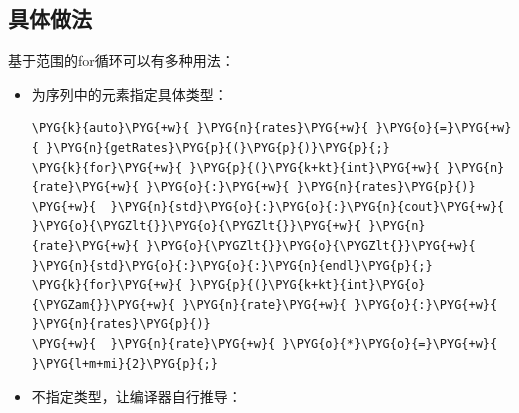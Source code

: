 
\subsection{具体做法}



基于范围的for循环可以有多种用法：



\begin{itemize}
\item 为序列中的元素指定具体类型：



\begin{codeblockbg}
\begin{Verbatim}[commandchars=\\\{\},breaklines=true,breakanywhere=true,fontsize=\codefont,xleftmargin=17bp]
\PYG{k}{auto}\PYG{+w}{ }\PYG{n}{rates}\PYG{+w}{ }\PYG{o}{=}\PYG{+w}{ }\PYG{n}{getRates}\PYG{p}{(}\PYG{p}{)}\PYG{p}{;}
\PYG{k}{for}\PYG{+w}{ }\PYG{p}{(}\PYG{k+kt}{int}\PYG{+w}{ }\PYG{n}{rate}\PYG{+w}{ }\PYG{o}{:}\PYG{+w}{ }\PYG{n}{rates}\PYG{p}{)}
\PYG{+w}{  }\PYG{n}{std}\PYG{o}{:}\PYG{o}{:}\PYG{n}{cout}\PYG{+w}{ }\PYG{o}{\PYGZlt{}}\PYG{o}{\PYGZlt{}}\PYG{+w}{ }\PYG{n}{rate}\PYG{+w}{ }\PYG{o}{\PYGZlt{}}\PYG{o}{\PYGZlt{}}\PYG{+w}{ }\PYG{n}{std}\PYG{o}{:}\PYG{o}{:}\PYG{n}{endl}\PYG{p}{;}
\PYG{k}{for}\PYG{+w}{ }\PYG{p}{(}\PYG{k+kt}{int}\PYG{o}{\PYGZam{}}\PYG{+w}{ }\PYG{n}{rate}\PYG{+w}{ }\PYG{o}{:}\PYG{+w}{ }\PYG{n}{rates}\PYG{p}{)}
\PYG{+w}{  }\PYG{n}{rate}\PYG{+w}{ }\PYG{o}{*}\PYG{o}{=}\PYG{+w}{ }\PYG{l+m+mi}{2}\PYG{p}{;}
\end{Verbatim}
\end{codeblockbg}



\item 不指定类型，让编译器自行推导：




\end{itemize}
